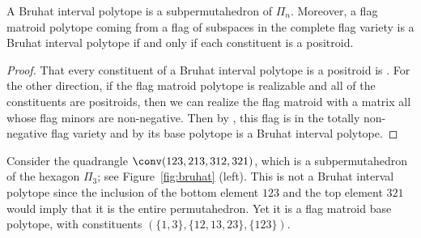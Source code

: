 \begin{proposition}
  \label{prop:bruhat}
  A Bruhat interval polytope is a subpermutahedron of $\Pi_n$. 
	Moreover, a flag matroid polytope coming from a flag of subspaces in the complete flag variety is a Bruhat interval polytope if and only if each constituent is a positroid. 
\end{proposition}
\begin{proof}
  That every constituent of a Bruhat interval polytope is a positroid is \cite[Corollary 6.11]{KodamaWilliams:2015}.
For the other direction, if the flag matroid polytope is realizable  and all of the constituents are positroids, then we can realize the flag matroid with a matrix all whose flag minors are non-negative. Then by \cite{Boretsky:2021}, this flag is in the totally non-negative flag variety and by \cite[Theorem 6.10]{KodamaWilliams:2015} its base polytope is a Bruhat interval polytope.
\end{proof}


\begin{example}
	\label{ex:bruhat}
	Consider the quadrangle $\conv(123,213,312,321)$, which is a subpermutahedron of the hexagon $\Pi_3$; see Figure~\ref{fig:bruhat} (left).
	This is not a Bruhat interval polytope since the inclusion of the bottom element $123$ and the top element $321$ would imply that it is the entire permutahedron.
	Yet it is a flag matroid base polytope, with constituents $(\{1,3\},\{12,13,23\},\{123\})$. 
\end{example}

